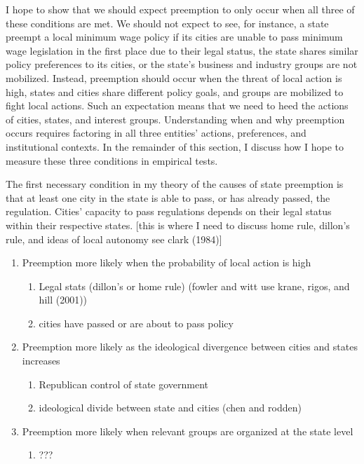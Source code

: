 \documentclass[12pt]{article}
\begin{document}
I hope to show that we should expect preemption to only occur when all three of these conditions are met. We should not expect to see, for instance, a state preempt a local minimum wage policy if its cities are unable to pass minimum wage legislation in the first place due to their legal status, the state shares similar policy preferences to its cities, or the state's business and industry groups are not mobilized. Instead, preemption should occur when the threat of local action is high, states and cities share different policy goals, and groups are mobilized to fight local actions. Such an expectation means that we need to heed the actions of cities, states, and interest groups. Understanding when and why preemption occurs requires factoring in all three entities' actions, preferences, and institutional contexts. In the remainder of this section, I discuss how I hope to measure these three conditions in empirical tests.

The first necessary condition in my theory of the causes of state preemption is that at least one city in the state is able to pass, or has already passed, the regulation. Cities' capacity to pass regulations depends on their legal status within their respective states. [this is where I need to discuss home rule, dillon's rule, and ideas of local autonomy see clark (1984)]

\begin{enumerate}
	\item Preemption more likely when the probability of local action is high
	\begin{enumerate}
		\item Legal stats (dillon's or home rule) (fowler and witt use krane, rigos, and hill (2001))
		\item cities have passed or are about to pass policy 
	\end{enumerate}
	\item Preemption more likely as the ideological divergence between cities and states increases
	\begin{enumerate}
		\item Republican control of state government
		\item ideological divide between state and cities (chen and rodden)
	\end{enumerate}
	\item Preemption more likely when relevant groups are organized at the state level
	\begin{enumerate}
		\item ???
	\end{enumerate}
\end{enumerate}
\end{document}
